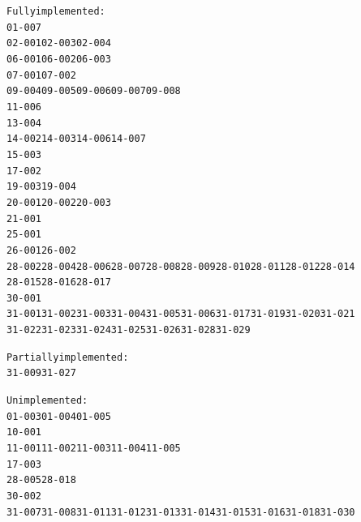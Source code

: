 \documentclass{book}
\begin{document}
{\footnotesize\begin{alltt}
   Fully implemented:
     01-007
     02-001 02-003 02-004
     06-001 06-002 06-003
     07-001 07-002
     09-004 09-005 09-006 09-007 09-008
     11-006
     13-004
     14-002 14-003 14-006 14-007
     15-003
     17-002
     19-003 19-004
     20-001 20-002 20-003
     21-001
     25-001
     26-001 26-002
     28-002 28-004 28-006 28-007 28-008 28-009 28-010 28-011 28-012 28-014
            28-015 28-016 28-017
     30-001
     31-001 31-002 31-003 31-004 31-005 31-006 31-017 31-019 31-020 31-021
            31-022 31-023 31-024 31-025 31-026 31-028 31-029

   Partially implemented:
     31-009 31-027

   Unimplemented:
     01-003 01-004 01-005
     10-001
     11-001 11-002 11-003 11-004 11-005
     17-003
     28-005 28-018
     30-002
     31-007 31-008 31-011 31-012 31-013 31-014 31-015 31-016 31-018 31-030
\end{alltt}}

\end{document}
